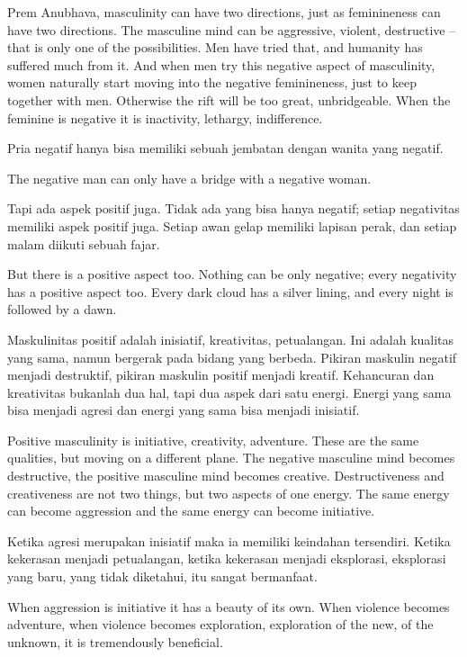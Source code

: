 \english
Prem Anubhava, masculinity can have two directions, just as feminineness can have two directions. The masculine mind can be aggressive, violent, destructive -- that is only one of the possibilities. Men have tried that, and humanity has suffered much from it. And when men try this negative aspect of masculinity, women naturally start moving into the negative feminineness, just to keep together with men. Otherwise the rift will be too great, unbridgeable. When the feminine is negative it is inactivity, lethargy, indifference.

\bahasa
Pria negatif hanya bisa memiliki sebuah jembatan dengan wanita yang negatif.

\english
The negative man can only have a bridge with a negative woman.

\bahasa
Tapi ada aspek positif juga. Tidak ada yang bisa hanya negatif; setiap negativitas memiliki aspek positif juga. Setiap awan gelap memiliki lapisan perak, dan setiap malam diikuti sebuah fajar.

\english
But there is a positive aspect too. Nothing can be only negative; every negativity has a positive aspect too. Every dark cloud has a silver lining, and every night is followed by a dawn.

\bahasa
Maskulinitas positif adalah inisiatif, kreativitas, petualangan. Ini adalah kualitas yang sama, namun bergerak pada bidang yang berbeda. Pikiran maskulin negatif menjadi destruktif, pikiran maskulin positif menjadi kreatif. Kehancuran dan kreativitas bukanlah dua hal, tapi dua aspek dari satu energi. Energi yang sama bisa menjadi agresi dan energi yang sama bisa menjadi inisiatif.

\english
Positive masculinity is initiative, creativity, adventure. These are the same qualities, but moving on a different plane. The negative masculine mind becomes destructive, the positive masculine mind becomes creative. Destructiveness and creativeness are not two things, but two aspects of one energy. The same energy can become aggression and the same energy can become initiative.

\bahasa
Ketika agresi merupakan inisiatif maka ia memiliki keindahan tersendiri. Ketika kekerasan menjadi petualangan, ketika kekerasan menjadi eksplorasi, eksplorasi yang baru, yang tidak diketahui, itu sangat bermanfaat.

\english
When aggression is initiative it has a beauty of its own. When violence becomes adventure, when violence becomes exploration, exploration of the new, of the unknown, it is tremendously beneficial.




